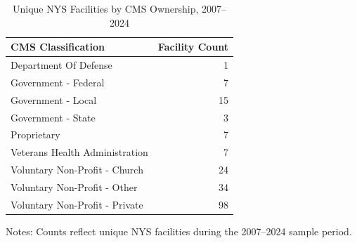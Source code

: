 \documentclass{article}
\begin{document}
\begin{table}[htbp]\centering\caption{Unique NYS Facilities by CMS Ownership, 2007--2024}\small\begin{threeparttable}
\begin{tabular}{lr}
\toprule
CMS Classification & Facility Count \\
\midrule
Department Of Defense & 1 \\
Government - Federal & 7 \\
Government - Local & 15 \\
Government - State & 3 \\
Proprietary & 7 \\
Veterans Health Administration & 7 \\
Voluntary Non-Profit - Church & 24 \\
Voluntary Non-Profit - Other & 34 \\
Voluntary Non-Profit - Private & 98 \\
\bottomrule
\end{tabular}
\begin{tablenotes}[flushleft]\footnotesize\item Notes: Counts reflect unique NYS facilities during the 2007--2024 sample period.\end{tablenotes}\end{threeparttable}\end{table}
\end{document}
